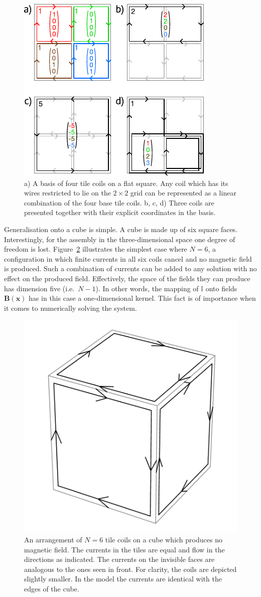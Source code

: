 \begin{figure}
  \centering
  \includegraphics[width=0.6\linewidth]{gfx/coils/tile_basis.pdf}
  \caption{a) A basis of four tile coils on a flat square. Any coil which has its wires restricted to lie on the $2 \times 2$ grid can be represented as a linear combination of the four base tile coils. b, c, d) Three coils are presented together with their explicit coordinates in the basis.}\label{fig:coils_tile_basis}
\end{figure}

Generalisation onto a cube is simple.
A cube is made up of six square faces. Interestingly, for the assembly in the three-dimensional space one degree of freedom is lost.
Figure~\ref{fig:coils_tile_kernel} illustrates the simplest case where $N = 6$, a configuration in which finite currents in all six coils cancel and no magnetic field is produced.
Such a combination of currents can be added to any solution with no effect on the produced field.
Effectively, the space of the fields they can produce has dimension five (i.e.\ $N-1$).
In other words, the mapping of $\mathbb{I}$ onto fields $\mathbf{B}(\mathbf{x})$ has in this case a one-dimensional kernel.
This fact is of importance when it comes to numerically solving the system.

\begin{figure}
  \centering
  \includegraphics[width=0.5\linewidth]{gfx/coils/tile_kernel2.pdf}
  \caption{An arrangement of $N = 6$ tile coils on a cube which produces no magnetic field. The currents in the tiles are equal and flow in the directions as indicated. The currents on the invisible faces are analogous to the ones seen in front. For clarity, the coils are depicted slightly smaller. In the model the currents are identical with the edges of the cube.}\label{fig:coils_tile_kernel}
\end{figure}

